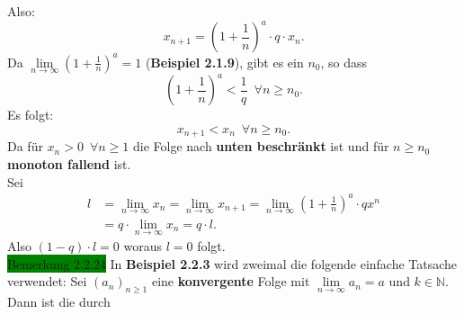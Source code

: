 \documentclass[landscape, 10pt]{article}
\newcommand{\N}{\mathbb{N}}
\begin{document}
\begin{multicols}{3}
                     Also:
                     \begin{equation*}
                            x_{n+1}=(1+\frac{1}{n})^a\cdot q\cdot x_n.
                     \end{equation*} 
                     Da \textcolor{NavyBlue}{
                     $\lim\limits_{n\to\infty}(1+\frac{1}{n})^a=1$}
                     (\textbf{Beispiel 2.1.9}), gibt es ein 
                     \textcolor{NavyBlue}{$n_0$}, so dass
                     \begin{equation*}
                            (1+\frac{1}{n})^a<\frac{1}{q}\enspace\forall n\geqslant n_0.
                     \end{equation*}
                     Es folgt: 
                     \begin{equation*}
                            x_{n+1}<x_n\enspace\forall n\geqslant n_0.
                     \end{equation*}
                     Da für \textcolor{NavyBlue}{
                     $x_n>0\enspace\forall n\geqslant1$} 
                     die Folge nach \textbf{unten beschränkt} ist und für 
                     \textcolor{NavyBlue}{$n\geqslant n_0$} \textbf{monoton
                     fallend} ist.\\
                     Sei 
                     \begin{align*}{}
                            l&=\lim\limits_{n\to\infty}x_n
                            =\lim\limits_{n\to\infty}x_{n+1}
                            =\lim\limits_{n\to\infty}(1+\frac{1}{n})^a\cdot qx^n\\
                            &=q\cdot\lim\limits_{n\to\infty}x_n
                            =q\cdot l.
                     \end{align*}
                     Also \textcolor{NavyBlue}{$(1-q)\cdot l=0$} woraus 
                     \textcolor{NavyBlue}{$l=0$} folgt.\\
              \colorbox{green}{Bemerkung 2.2.24} 
                     In \textbf{Beispiel 2.2.3} wird zweimal die 
                     folgende einfache Tatsache verwendet: Sei 
                     \textcolor{NavyBlue}{$(a_n)_{n\geqslant1}$} 
                     eine 
                     \textbf{konvergente} Folge mit 
                     \textcolor{NavyBlue}{$\lim\limits_{n\to\infty}a_n=a$}
                     und 
                     \textcolor{NavyBlue}{$k\in\N$}. 
                     Dann ist die durch 
                     \begin{equation*}

\end{equation*}
\end{multicols}
\end{document}
